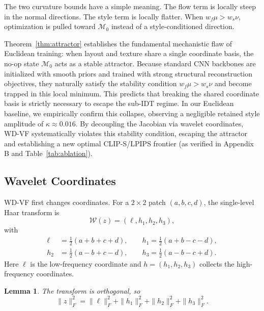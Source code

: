 \documentclass[letterpaper]{article}
\newtheorem{lemma}{Lemma}
\begin{document}
The two curvature bounds have a simple meaning.
The flow term is locally steep in the normal directions.
The style term is locally flatter.
When $w_f\mu>w_s\nu$, optimization is pulled toward $\mathcal M_0$ instead of a style-conditioned direction.

Theorem~\ref{thm:attractor} establishes the fundamental mechanistic flaw of Euclidean training: when layout and texture share a single coordinate basis, the no-op state $\mathcal M_0$ acts as a stable attractor. Because standard CNN backbones are initialized with smooth priors and trained with strong structural reconstruction objectives, they naturally satisfy the stability condition $w_f\mu > w_s\nu$ and become trapped in this local minimum. 
This predicts that breaking the shared coordinate basis is strictly necessary to escape the sub-IDT regime.
In our Euclidean baseline, we empirically confirm this collapse, observing a negligible retained style amplitude of $\kappa\approx0.016$. 
By decoupling the Jacobian via wavelet coordinates, WD-VF systematically violates this stability condition, escaping the attractor and establishing a new optimal CLIP-S/LPIPS frontier (as verified in Appendix B and Table~\ref{tab:ablation}).

\subsection{Wavelet Coordinates}
\label{sec:fiberbundle}

WD-VF first changes coordinates. For a $2\times2$ patch $(a,b,c,d)$, the single-level Haar transform is
\begin{equation}
\mathcal W(z) = (\ell,h_1,h_2,h_3),
\end{equation}
with
\begin{equation}
\begin{aligned}
\ell&=\tfrac12(a+b+c+d),\qquad
h_1=\tfrac12(a+b-c-d),\\
h_2&=\tfrac12(a-b+c-d),\qquad
h_3=\tfrac12(a-b-c+d).
\end{aligned}
\end{equation}
Here $\ell$ is the low-frequency coordinate and $h=(h_1,h_2,h_3)$ collects the high-frequency coordinates.

\begin{lemma}
\label{lem:iso}
The transform is orthogonal, so
\begin{equation}
\|z\|_F^2 = \|\ell\|_F^2 + \|h_1\|_F^2 + \|h_2\|_F^2 + \|h_3\|_F^2.
\end{equation}
\end{lemma}
\end{document}

